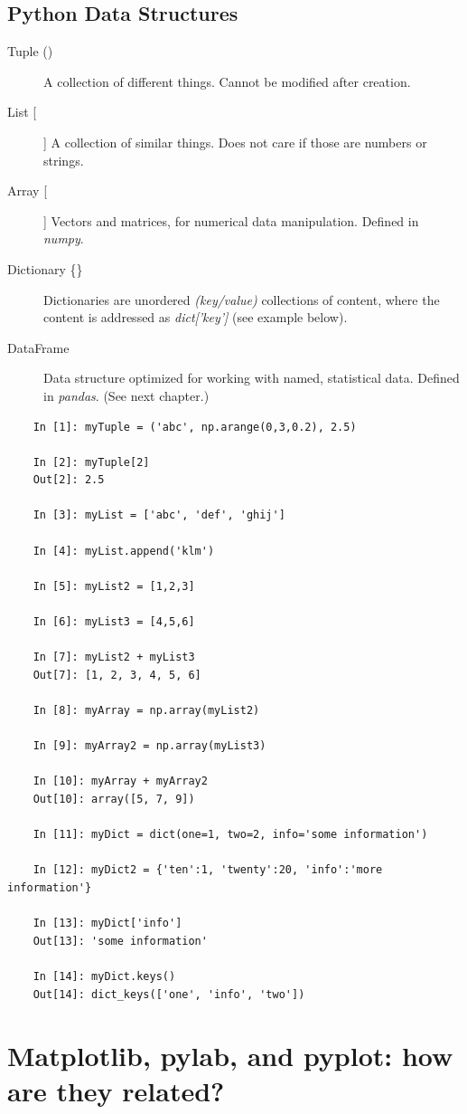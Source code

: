 \subsection{Python Data Structures}

\begin{description}
  \item[Tuple ()] A collection of different things. Cannot be modified after creation.
  \item[List [] ] A collection of similar things. Does not care if those are numbers or strings.
  \item[Array [] ] Vectors and matrices, for numerical data manipulation. Defined in \emph{numpy}.
  \item[Dictionary \{\}] Dictionaries are unordered \emph{(key/value)} collections of content, where the content is addressed as \emph{dict['key']} (see example below).
  \item[DataFrame] Data structure optimized for working with named, statistical data. Defined in \emph{pandas}. (See next chapter.)
\end{description}

\begin{lstlisting}
    In [1]: myTuple = ('abc', np.arange(0,3,0.2), 2.5)

    In [2]: myTuple[2]
    Out[2]: 2.5

    In [3]: myList = ['abc', 'def', 'ghij']

    In [4]: myList.append('klm')

    In [5]: myList2 = [1,2,3]

    In [6]: myList3 = [4,5,6]

    In [7]: myList2 + myList3
    Out[7]: [1, 2, 3, 4, 5, 6]

    In [8]: myArray = np.array(myList2)

    In [9]: myArray2 = np.array(myList3)

    In [10]: myArray + myArray2
    Out[10]: array([5, 7, 9])

    In [11]: myDict = dict(one=1, two=2, info='some information')

    In [12]: myDict2 = {'ten':1, 'twenty':20, 'info':'more information'}

    In [13]: myDict['info']
    Out[13]: 'some information'

    In [14]: myDict.keys()
    Out[14]: dict_keys(['one', 'info', 'two'])
\end{lstlisting}

\section{Matplotlib, pylab, and pyplot: how are they related?}


